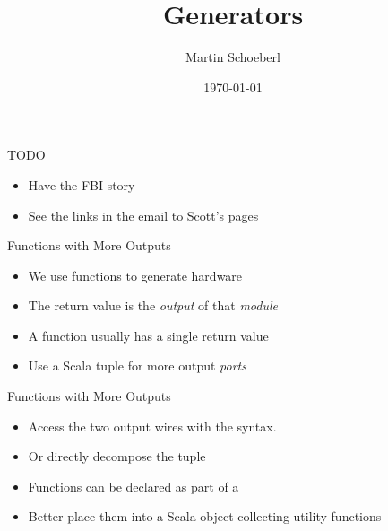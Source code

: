 

\newif\ifbook


\usepackage{tikz}
\usetikzlibrary{positioning, arrows.meta}


\title{Generators}
\author{Martin Schoeberl}
\date{\today}



\begin{frame}
\titlepage
\end{frame}

\begin{frame}[fragile]{TODO}
\begin{itemize}
\item Have the FBI story
\item See the links in the email to Scott's pages
\end{itemize}
\end{frame}

\begin{frame}[fragile]{Functions with More Outputs}
\begin{itemize}
\item We use functions to generate hardware
\item The return value is the \emph{output} of that \emph{module}
\item A function usually has a single return value
\item Use a Scala tuple for more output \emph{ports}
\end{itemize}
\end{frame}

\begin{frame}[fragile]{Functions with More Outputs}
\begin{itemize}
\item Access the two output wires with the  syntax.
\item Or directly decompose the tuple
\item Functions can be declared as part of a 
\item Better place them into a Scala object collecting utility functions
\end{itemize}
\end{frame}

